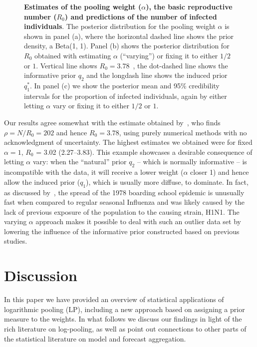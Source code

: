 \documentclass[a4paper, notitlepage, 11pt]{article}
\begin{document}
\begin{figure}[!ht]
\begin{center}
\end{center}
\caption{\textbf{Estimates of the pooling weight ($\alpha$), the basic reproductive number ($R_0$) and predictions of the number of infected individuals}.
The posterior distribution for the pooling weight $\alpha$ is shown in panel (a), where the horizontal dashed line shows the prior density, a Beta(1, 1).
Panel (b) shows the posterior distribution for $R_0$ obtained with estimating $\alpha$ (``varying'') or fixing it to either $1/2$ or $1$.
Vertical line shows $R_0 = 3.78$~\citep{Murray2002}, the dot-dashed line shows the informative prior $q_2$ and the longdash line shows the induced prior $q_1^\ast$.
In panel (c) we show the posterior mean and 95\% credibility intervals for the proportion of infected individuals, again by either letting $\alpha$ vary or fixing it to either $1/2$ or $1$.
}
\label{fig:SIR_results}
\end{figure}

Our results agree somewhat with the estimate obtained by~\cite{Murray2002}, who finds $\rho = N/R_0 = 202$ and hence $R_0 = 3.78$, using purely numerical methods with no acknowledgment of uncertainty.
The highest estimates we obtained were for fixed $\alpha = 1$, $R_0$ = 3.02 (2.27--3.83).
This example showcases a desirable consequence of letting $\alpha$ vary: when the ``natural'' prior $q_2$ -- which is normally informative -- is incompatible with the data, it will receive a lower weight ($\alpha$ closer 1) and hence allow the induced prior ($q_1$), which is usually more diffuse, to dominate.
In fact, as discussed by~\cite{Biggerstaff2014}, the spread of the 1978 boarding school epidemic is unusually fast when compared to regular seasonal Influenza and was likely caused by the lack of previous exposure of the population to the causing strain, H1N1.
The varying $\alpha$ approach makes it possible to deal with such an outlier data set by lowering the influence of the informative prior constructed based on previous studies.

\section{Discussion}
\label{sec:discussion}

In this paper we have provided an overview of statistical applications of logarithmic pooling (LP), including a new approach based on assigning a prior measure to the weights.
In what follows we discuss our findings in light of the rich literature on log-pooling, as well as point out connections to other parts of the statistical literature on model and forecast aggregation.
\end{document}
